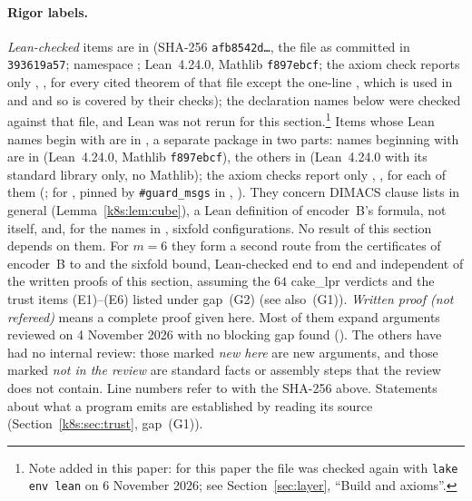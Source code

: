 \paragraph{Rigor labels.} \emph{Lean-checked} items are in  (SHA-256
\texttt{afb8542d\dots}, the file as committed in \texttt{393619a57}; namespace ;
Lean~4.24.0, Mathlib \texttt{f897ebcf}; the axiom check  reports only ,
,  for every cited theorem of that file except the one-line
, which is used in  and  and so is covered by their
checks); the declaration names below were
checked against that file, and Lean was not rerun for this section.\footnote{Note added in this paper: for this paper the file was checked again with \texttt{lake env lean} on 6 November 2026; see Section~\ref{sec:layer}, ``Build and axioms''.} Items whose Lean names begin with  are in , a separate
package in two parts: names beginning with  are in  (Lean~4.24.0, Mathlib
\texttt{f897ebcf}), the others in  (Lean~4.24.0 with its standard library only, no Mathlib); the
axiom checks report only , ,  for each of them
(; for , pinned by \texttt{\#guard\_msgs} in
, ). They concern DIMACS
clause lists in general (Lemma~\ref{k8s:lem:cube}), a Lean definition of encoder~B's formula, not
 itself, and, for the names in , sixfold configurations. No result of this section depends on them. For $m=6$ they form a second route from the
certificates of encoder~B to  and the sixfold bound, Lean-checked end to end and independent of the
written proofs of this section, assuming the $64$ cake\_lpr verdicts and the trust items (E1)--(E6) listed under
gap~(G2) (see also~(G1)). \emph{Written proof (not refereed)} means a
complete proof given here. Most of them expand arguments reviewed on 4 November 2026 with no blocking gap found
(). The others have had no internal review: those marked \emph{new here} are new
arguments, and those marked \emph{not in the review} are standard facts or assembly steps that the review does not
contain. Line numbers refer to  with the SHA-256 above. Statements about what a program emits are
established by reading its source (Section~\ref{k8s:sec:trust}, gap~(G1)).

